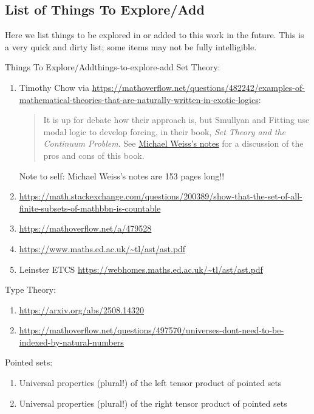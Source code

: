 \subsection{List of Things To Explore/Add}\label{subsection-things-to-explore-add}
Here we list things to be explored in or added to this work in the future. This is a very quick and dirty list; some items may not be fully intelligible.
\begin{remark}{Things To Explore/Add}{things-to-explore-add}%
    Set Theory:
    \begin{enumerate}
        \item Timothy Chow via \url{https://mathoverflow.net/questions/482242/examples-of-mathematical-theories-that-are-naturally-written-in-exotic-logics}:
            \begin{quote}
                It is up for debate how  their approach is, but Smullyan and Fitting use modal logic to develop forcing, in their book, \textit{Set Theory and the Continuum Problem}. See \href{https://web.archive.org/web/20241111150333/https://diagonalargument.com/wp-content/uploads/2019/03/smullyan.pdf}{Michael Weiss's notes} for a discussion of the pros and cons of this book.
            \end{quote}
            Note to self: Michael Weiss's notes are 153 pages long!!
        \item \url{https://math.stackexchange.com/questions/200389/show-that-the-set-of-all-finite-subsets-of-mathbbn-is-countable}
        \item \url{https://mathoverflow.net/a/479528}
        \item \url{https://www.maths.ed.ac.uk/~tl/ast/ast.pdf}
        \item Leinster ETCS \url{https://webhomes.maths.ed.ac.uk/~tl/ast/ast.pdf}
    \end{enumerate}
    Type Theory:
    \begin{enumerate}
        \item \url{https://arxiv.org/abs/2508.14320}
        \item \url{https://mathoverflow.net/questions/497570/universes-dont-need-to-be-indexed-by-natural-numbers}
    \end{enumerate}
    Pointed sets:
    \begin{enumerate}
        \item Universal properties (plural!) of the left tensor product of pointed sets
        \item Universal properties (plural!) of the right tensor product of pointed sets

\end{enumerate}
\end{remark}
